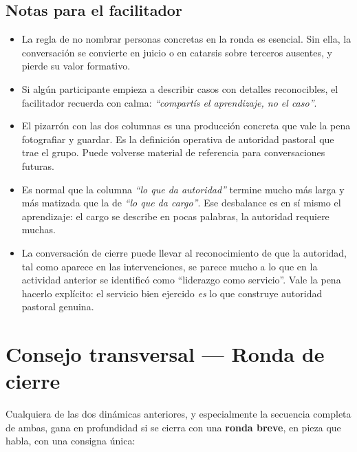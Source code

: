 \documentclass[11pt, a4paper]{article}
\begin{document}
\begin{actividad}
\subsection*{Notas para el facilitador}
\begin{itemize}
  \item La regla de no nombrar personas concretas en la ronda es esencial. Sin ella, la conversación se convierte en juicio o en catarsis sobre terceros ausentes, y pierde su valor formativo.
  \item Si algún participante empieza a describir casos con detalles reconocibles, el facilitador recuerda con calma: \emph{``compartís el aprendizaje, no el caso''}.
  \item El pizarrón con las dos columnas es una producción concreta que vale la pena fotografiar y guardar. Es la definición operativa de autoridad pastoral que trae el grupo. Puede volverse material de referencia para conversaciones futuras.
  \item Es normal que la columna \emph{``lo que da autoridad''} termine mucho más larga y más matizada que la de \emph{``lo que da cargo''}. Ese desbalance es en sí mismo el aprendizaje: el cargo se describe en pocas palabras, la autoridad requiere muchas.
  \item La conversación de cierre puede llevar al reconocimiento de que la autoridad, tal como aparece en las intervenciones, se parece mucho a lo que en la actividad anterior se identificó como ``liderazgo como servicio''. Vale la pena hacerlo explícito: el servicio bien ejercido \emph{es} lo que construye autoridad pastoral genuina.
\end{itemize}

\end{actividad}

\newpage

\section*{Consejo transversal --- Ronda de cierre}

Cualquiera de las dos dinámicas anteriores, y especialmente la secuencia completa de ambas, gana en profundidad si se cierra con una \textbf{ronda breve}, en pieza que habla, con una consigna única:

\vspace{0.5em}
\end{document}
